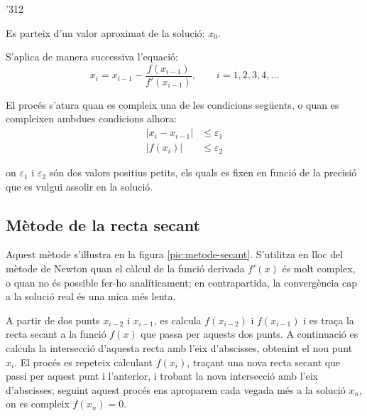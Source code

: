 \begin{dingautolist}{'312}
    \item Es parteix d'un valor aproximat de la solució: $x_0$.

    \item   S'aplica de manera successiva l'equació:
            \begin{equation}\label{eq:newton}
              x_i = x_{i-1} - \frac{f(x_{i-1})}{f'(x_{i-1})}, \qquad i=1,2,3,4, \dots
            \end{equation}

    \item   El procés s'atura quan es compleix una de les condicions següents, o quan es compleixen ambdues condicions alhora:
            \begin{subequations}\begin{align}
              |x_i - x_{i-1}| &\leq \varepsilon_1 \\
              |f(x_i)| &\leq \varepsilon_2
            \end{align}\end{subequations}

            on $\varepsilon_1$ i $\varepsilon_2$ són dos valors positius petits, els quals es fixen en funció de la precisió que es vulgui assolir en la solució.
\end{dingautolist}



\subsection{Mètode de la recta secant}

Aquest mètode s'iŀlustra en la figura \vref{pic:metode-secant}. S'utilitza en lloc del mètode de Newton quan el càlcul de  la funció derivada $f'(x)$ és molt complex, o quan no és possible fer-ho analíticament; en contrapartida, la convergència cap a la solució real és una
mica més lenta.

A partir de dos punts $x_{i-2}$ i $x_{i-1}$, es calcula $f(x_{i-2})$ i $f(x_{i-1})$ i es traça la recta secant a la funció $f(x)$ que passa per aquests dos punts. A continuació es calcula la intersecció d'aquesta recta amb l'eix d'abscisses, obtenint el nou punt $x_i$. El procés es repeteix calculant $f(x_i)$, traçant una nova recta secant que passi per aquest punt i l'anterior, i trobant la nova intersecció amb l'eix d'abscisses; seguint aquest procés ens aproparem cada vegada més a la solució $x_n$, on es compleix $f(x_n)=0$.

